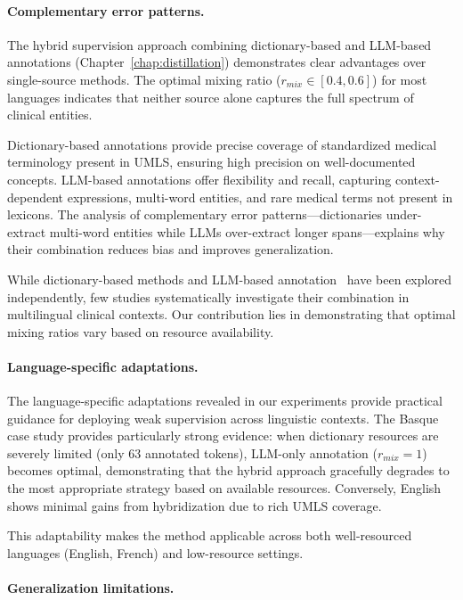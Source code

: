 \paragraph{Complementary error patterns.}

The hybrid supervision approach combining dictionary-based and LLM-based annotations (Chapter~\ref{chap:distillation}) demonstrates clear advantages over single-source methods.
The optimal mixing ratio ($r_{mix} \in [0.4, 0.6]$) for most languages indicates that neither source alone captures the full spectrum of clinical entities.

Dictionary-based annotations provide precise coverage of standardized medical terminology present in UMLS, ensuring high precision on well-documented concepts.
LLM-based annotations offer flexibility and recall, capturing context-dependent expressions, multi-word entities, and rare medical terms not present in lexicons.
The analysis of complementary error patterns—dictionaries under-extract multi-word entities while LLMs over-extract longer spans—explains why their combination reduces bias and improves generalization.

While dictionary-based methods and LLM-based annotation~\cite{agrawal_large_2022} have been explored independently, few studies systematically investigate their combination in multilingual clinical contexts.
Our contribution lies in demonstrating that optimal mixing ratios vary based on resource availability.

\paragraph{Language-specific adaptations.}

The language-specific adaptations revealed in our experiments provide practical guidance for deploying weak supervision across linguistic contexts.
The Basque case study provides particularly strong evidence: when dictionary resources are severely limited (only 63 annotated tokens), LLM-only annotation ($r_{mix} = 1$) becomes optimal, demonstrating that the hybrid approach gracefully degrades to the most appropriate strategy based on available resources.
Conversely, English shows minimal gains from hybridization due to rich UMLS coverage.

This adaptability makes the method applicable across both well-resourced languages (English, French) and low-resource settings.

\paragraph{Generalization limitations.}

